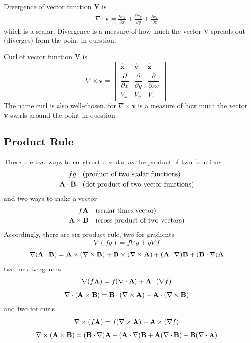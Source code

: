 \documentclass[../main.tex]{subfiles}
\begin{document}
Divergence of vector function \textbf{V} is
\begin{align*}
    \nabla \cdot  \mathbf{v}= \frac{\partial v_x}{\partial x}+\frac{\partial v_y}{\partial y}+\frac{\partial v_z}{\partial z}
\end{align*}
which is a scalar. Divergence is a measure of how much the vector V spreads out (diverges) from the point in question.

Curl of vector function \textbf{V} is
\begin{equation*}
    \nabla \times  \mathbf{v}=
    \begin{vmatrix}
         \mathbf{\hat{x}}& \mathbf{\hat{y}}& \mathbf{\hat{z}}\\
        \dfrac{\partial }{\partial x}&\dfrac{\partial}{\partial y}&\dfrac{\partial }{\partial zx}\\
        V_x&V_y&V_z
    \end{vmatrix} 
\end{equation*}
The name curl is also well-chosen, for $\nabla \times  \mathbf{v}$ is a measure of how much the vector \textbf{v} swirls around the point in question. 

\subsection*{Product Rule}
There are two ways to construct a scalar as the product of two functions
\begin{align*}
    fg\quad&\text{(product of two scalar functions)}\\
    \mathbf{A}\cdot \mathbf{B}\quad&\text{(dot product of two vector functions)}
\end{align*}
and two ways to make a vector
\begin{align*}
    f\mathbf{A}\quad&\text{(scalar times vector)}\\
    \mathbf{A}\times \mathbf{B}\quad&\text{(cross product of two vectors)}
\end{align*}
Accordingly, there are six product rule, two for gradients
\begin{equation*}
    \nabla ( f g) = f \nabla g + g\nabla f
\end{equation*}
\begin{equation*}
    \nabla(\mathbf{A} \cdot \mathbf{B}) = \mathbf{A} \times (\nabla \times  \mathbf{B}) + \mathbf{B} \times  (\nabla \times  \mathbf{A}) + (\mathbf{A} \cdot \nabla)\mathbf{B} + (\mathbf{B} \cdot \nabla)\mathbf{A}
\end{equation*}
two for divergences
\begin{equation*}
    \nabla ( f \mathbf{A}) = f (\nabla \cdot \mathbf{A}) + \mathbf{A}\cdot(\nabla f)
\end{equation*}
\begin{equation*}
    \nabla\cdot (\mathbf{A} \times \mathbf{B}) = \mathbf{B}\cdot (\nabla \times  \mathbf{A})-\mathbf{A}\cdot (\nabla \times \mathbf{B})
\end{equation*}
and two for curls
\begin{equation*}
    \nabla \times ( f \mathbf{A}) = f (\nabla \times \mathbf{A}) - \mathbf{A} \times (\nabla f )
\end{equation*}
\begin{equation*}
    \nabla \times (\mathbf{A} \times \mathbf{B}) = (\mathbf{B} \cdot \nabla)\mathbf{A} - (\mathbf{A} \cdot \nabla)\mathbf{B} + \mathbf{A}(\nabla \cdot \mathbf{B}) - \mathbf{B}(\nabla \cdot \mathbf{A})
\end{equation*}
\end{document}
